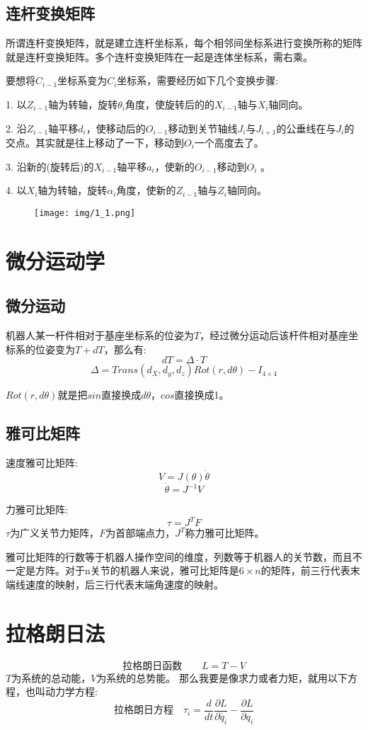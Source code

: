 \documentclass[12pt, a4paper, oneside]{ctexbook}
\begin{document}
\subsection{连杆变换矩阵}

所谓连杆变换矩阵，就是建立连杆坐标系，每个相邻间坐标系进行变换所称的矩阵就是连杆变换矩阵。多个连杆变换矩阵在一起是连体坐标系，需右乘。

要想将$C_{i-1}$坐标系变为$C_i$坐标系，需要经历如下几个变换步骤:

1. 以$Z_{i-1}$轴为转轴，旋转$\theta_i$角度，使旋转后的的$X_{i-1}$轴与$X_i$轴同向。

2. 沿$Z_{i-1}$轴平移$d_i$，使移动后的$O_{i-1}$移动到关节轴线$J_i$与$J_{i+1}$的公垂线在与$J_i$的交点。其实就是往上移动了一下，移动到$O_i$一个高度去了。

3. 沿新的(旋转后)的$X_{i-1}$轴平移$a_i$，使新的$O_{i-1}$移动到$O_i$ 。

4. 以$X_i$轴为转轴，旋转$\alpha_i$角度，使新的$Z_{i-1}$轴与$Z_i$轴同向。
\begin{figure}[htbp]
	\centering
	\texttt{[image: img/1\_1.png]}
\end{figure}
\newpage

\section{微分运动学}
\subsection{微分运动}
机器人某一杆件相对于基座坐标系的位姿为$T$，经过微分运动后该杆件相对基座坐标系的位姿变为$T+dT$，那么有:
$$
dT=\Delta·T
$$
$$
\Delta=Trans(d_X,d_y,d_z)Rot(r,d\theta)-I_{4\times4}
$$

$Rot(r,d\theta)$就是把$sin$直接换成$d\theta$，$cos$直接换成1。
\subsection{雅可比矩阵}
速度雅可比矩阵:
$$
V=J(\theta)\dot{\theta}
$$
$$
\dot{\theta}=J^{-1}V
$$

力雅可比矩阵:
$$
\tau = J^T F
$$
$\tau$为广义关节力矩阵，$F$为首部端点力，$J^T$称力雅可比矩阵。

雅可比矩阵的行数等于机器人操作空间的维度，列数等于机器人的关节数，而且不一定是方阵。对于n关节的机器人来说，雅可比矩阵是$6\times n$的矩阵，前三行代表末端线速度的映射，后三行代表末端角速度的映射。

\section{拉格朗日法}
$$
\mbox{拉格朗日函数} \qquad L=T-V
$$
$T$为系统的总动能，$V$为系统的总势能。
那么我要是像求力或者力矩，就用以下方程，也叫动力学方程:
$$
\mbox{拉格朗日方程} \quad \tau_i=\frac{d}{dt}\frac{\partial L}{\partial \dot{q_i}}-\frac{\partial L}{\partial q_i}
$$
\end{document}
